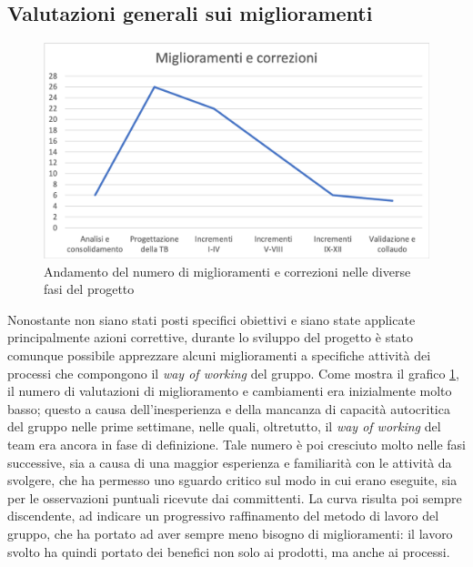 	\subsection{Valutazioni generali sui miglioramenti}
		\begin{figure}[H]
			\centering
			\includegraphics[width=1.0\linewidth]{./res/images/miglioramenti.png}
			\caption{Andamento del numero di miglioramenti e correzioni nelle diverse fasi del progetto}
			\label{fig:Andamento del numero di miglioramenti e correzioni nelle diverse fasi del progetto}
		\end{figure}
	
		Nonostante non siano stati posti specifici obiettivi e siano state applicate principalmente azioni correttive, durante lo sviluppo del progetto è stato comunque possibile apprezzare alcuni miglioramenti a specifiche attività dei processi che compongono il \textit{way of working} del gruppo. Come mostra il grafico \ref{fig:Andamento del numero di miglioramenti e correzioni nelle diverse fasi del progetto}, il numero di valutazioni di miglioramento e cambiamenti era inizialmente molto basso; questo a causa dell'inesperienza e della mancanza di capacità autocritica del gruppo nelle prime settimane, nelle quali, oltretutto, il \textit{way of working} del team era ancora in fase di definizione. Tale numero è poi cresciuto molto nelle fasi successive, sia a causa di una maggior esperienza e familiarità con le attività da svolgere, che ha permesso uno sguardo critico sul modo in cui erano eseguite, sia per le osservazioni puntuali ricevute dai committenti. La curva risulta poi sempre discendente, ad indicare un progressivo raffinamento del metodo di lavoro del gruppo, che ha portato ad aver sempre meno bisogno di miglioramenti: il lavoro svolto ha quindi portato dei benefici non solo ai prodotti, ma anche ai processi.
	
